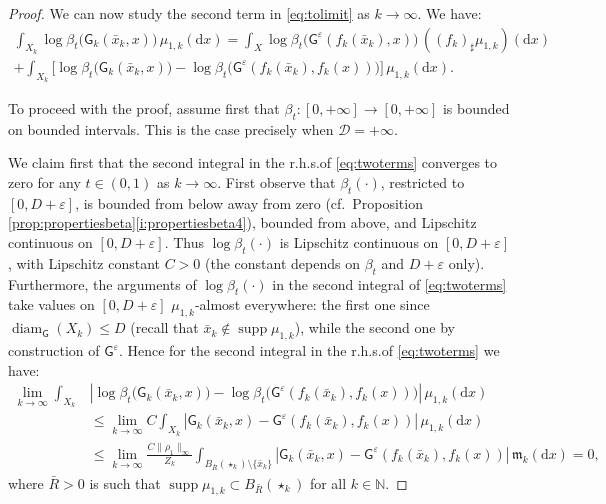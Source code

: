 \documentclass[11pt,a4paper]{article}
\theoremstyle{plain}
\theoremstyle{definition}
\theoremstyle{remark}
\numberwithin{equation}{section}
\newcommand{\N}{\mathbb{N}} %
\DeclareMathOperator{\supp}{\mathrm{supp}}
\newcommand{\ve}{\varepsilon}
\newcommand{\cD}{\mathcal{D}}
\DeclareMathOperator{\diam}{\mathrm{diam}}
\newcommand{\di}{\mathrm{d}}
\newcommand{\mm}{\mathfrak m}
\newcommand{\sfG}{\mathsf G}
\begin{document}
\begin{proof}
We can now study the second term in \eqref{eq:tolimit} as $k\to \infty$. We have:
\begin{equation}\label{eq:twoterms}
\begin{multlined}
\int_{X_k} \log\beta_t\big(\sfG_k(\bar{x}_k,x)\big)\,\mu_{1,k}(\di x)  = \int_{X} \log\beta_t\big(\sfG^{\ve}(f_k(\bar{x}_k),x)\big)\,((f_k)_\sharp\mu_{1,k})(\di x)\\
+\int_{X_k} \Big[\log\beta_t \big(\sfG_k(\bar{x}_k,x)\big)-\log\beta_t \big(\sfG^{\ve} (f_k(\bar{x}_k),f_k(x))\big) \Big]\,\mu_{1,k}(\di x).
\end{multlined}
\end{equation}

To proceed with the proof, assume first that $\beta_t:[0,+\infty]\to [0,+\infty]$ is bounded on bounded intervals. This is the case precisely when $\cD=+\infty$.

We claim first that the second integral in the r.h.s.\@ of \eqref{eq:twoterms} converges to zero for any $t\in (0,1)$ as $k\to \infty$. First observe that $\beta_t(\cdot)$, restricted to $[0,D+\ve]$, is bounded from below away from zero (cf.\ Proposition \ref{prop:propertiesbeta}\ref{i:propertiesbeta4}), bounded from above, and Lipschitz continuous on $[0,D+\ve]$. Thus $\log\beta_t(\cdot)$ is Lipschitz continuous on $[0,D+\ve]$, with Lipschitz constant $C>0$ (the constant depends on $\beta_t$ and $D+\ve$ only). Furthermore, the arguments of $\log\beta_t(\cdot)$ in the second integral of \eqref{eq:twoterms} take values on $[0,D+\ve]$ $\mu_{1,k}$-almost everywhere: the first one since $\diam_{\sfG}(X_k)\leq D$ (recall that $\bar{x}_k\notin \supp\mu_{1,k}$), while the second one by construction of $\sfG^{\ve}$. Hence for the second integral in the r.h.s.\@ of \eqref{eq:twoterms} we have:
\begin{align}
\lim_{k\to \infty}\int_{X_k} &\left\lvert\log\beta_t\big(\sfG_k(\bar{x}_k,x)\big)-\log\beta_t\big(\sfG^{\ve}(f_k(\bar{x}_k),f_k(x))\big)\right\rvert\, \mu_{1,k}(\di x)  \\
 &\leq \lim_{k\to \infty} C \int_{X_k}\left\lvert\sfG_k(\bar{x}_k,x)-\sfG^{\ve}(f_k(\bar{x}_k),f_k(x))\right\rvert\, \mu_{1,k}(\di x) \label{eq:lipschitzproperty} \\
& \leq \lim_{k\to \infty} \frac{C \|\rho_{1}\|_{\infty}}{ Z_k}  \int_{B_{\bar{R}}(\star_{k})\setminus \{\bar{x}_k\}}\left\lvert\sfG_k(\bar{x}_k,x)-\sfG^{\ve}(f_k(\bar{x}_k),f_k(x))\right\rvert\, \mm_{k}(\di x)  =0,
\end{align}
where $\bar{R}>0$ is such that $\supp\mu_{1,k}\subset B_{\bar{R}}(\star_k)$ for all $k\in \N$.


\end{proof}
\end{document}
